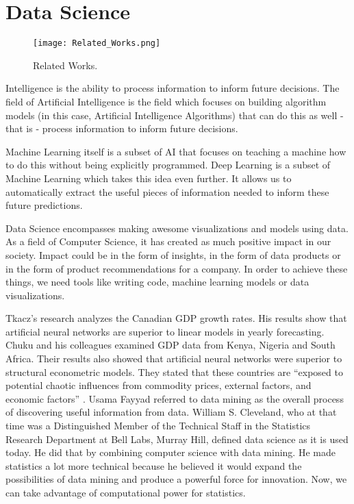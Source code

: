 

\section{Data Science}

\begin{figure}[h!]
	\centering
	\texttt{[image: Related\_Works.png]}
	\caption{Related Works.\protect\cite{tkacz2001neural, chuku2017intelligent, kiss2011significance, yamak2019comparison}}
	\label{fig:relatedWorks}
\end{figure}

Intelligence is the ability to process information to inform future decisions. The field of Artificial Intelligence is the field which focuses on building algorithm models (in this case, Artificial Intelligence \cite{black2009books} Algorithms) that can do this as well - that is - process information to inform future decisions.

Machine Learning itself is a subset of AI that focuses on teaching a machine how to do this without being explicitly programmed. Deep Learning is a subset of Machine Learning which takes this idea even further. It allows us to automatically extract the useful pieces of information needed to inform these future predictions.


Data Science encompasses making awesome visualizations and models using data. As a field of Computer Science, it has created as much positive impact in our society. Impact could be in the form of insights, in the form of data products or in the form of product recommendations for a company. In order to achieve these things, we need tools like writing code, machine learning models or data visualizations.

Tkacz's \cite{tkacz2001neural} research analyzes the Canadian GDP growth rates. His results show that artificial neural networks are superior to linear models in yearly forecasting.
Chuku  and his colleagues \cite{chuku2017intelligent} examined GDP data from Kenya, Nigeria and South Africa. Their results also showed that artificial neural networks were superior to structural econometric models. They stated that these countries are \enquote{exposed to potential chaotic influences from commodity prices, external factors, and economic factors} \cite[p.25]{chuku2017intelligent}. Usama Fayyad \cite{fayyad1996data} referred to data mining as the overall process of discovering useful information from data. William S. Cleveland, \cite{cleveland2001data} who at that time was a Distinguished Member of the Technical Staff in the Statistics Research Department at Bell Labs, Murray Hill, defined data science as it is used today. He did that by combining computer science with data mining. He made statistics a lot more technical because he believed it would expand the possibilities of data mining and produce a powerful force for innovation. Now, we can take advantage of computational power for statistics.



